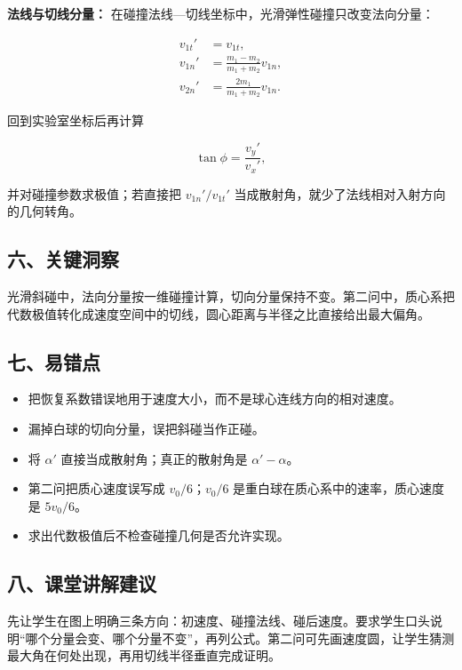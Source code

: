 \documentclass[12pt,a4paper,UTF8]{ctexart}
\newcommand{\tightlist}{\setlength{\itemsep}{0pt}\setlength{\parskip}{0pt}}
\begin{document}
\textbf{法线与切线分量：}
在碰撞法线---切线坐标中，光滑弹性碰撞只改变法向分量：

\[\begin{aligned}
v_{1t}'&=v_{1t},\\
v_{1n}'&=\frac{m_1-m_2}{m_1+m_2}v_{1n},\\
v_{2n}'&=\frac{2m_1}{m_1+m_2}v_{1n}.
\end{aligned}\]

回到实验室坐标后再计算

\[\tan\phi=\frac{v_y'}{v_x'},\]

并对碰撞参数求极值；若直接把 \(v_{1n}'/v_{1t}'\)
当成散射角，就少了法线相对入射方向的几何转角。

\subsection{六、关键洞察}\label{ux516dux5173ux952eux6d1eux5bdf}

光滑斜碰中，法向分量按一维碰撞计算，切向分量保持不变。第二问中，质心系把代数极值转化成速度空间中的切线，圆心距离与半径之比直接给出最大偏角。

\subsection{七、易错点}\label{ux4e03ux6613ux9519ux70b9}

\begin{itemize}
\tightlist
\item
  把恢复系数错误地用于速度大小，而不是球心连线方向的相对速度。
\item
  漏掉白球的切向分量，误把斜碰当作正碰。
\item
  将 \(\alpha'\) 直接当成散射角；真正的散射角是 \(\alpha'-\alpha\)。
\item
  第二问把质心速度误写成 \(v_0/6\)；\(v_0/6\)
  是重白球在质心系中的速率，质心速度是 \(5v_0/6\)。
\item
  求出代数极值后不检查碰撞几何是否允许实现。
\end{itemize}

\subsection{八、课堂讲解建议}\label{ux516bux8bfeux5802ux8bb2ux89e3ux5efaux8bae}

先让学生在图上明确三条方向：初速度、碰撞法线、碰后速度。要求学生口头说明``哪个分量会变、哪个分量不变''，再列公式。第二问可先画速度圆，让学生猜测最大角在何处出现，再用切线半径垂直完成证明。
\end{document}
